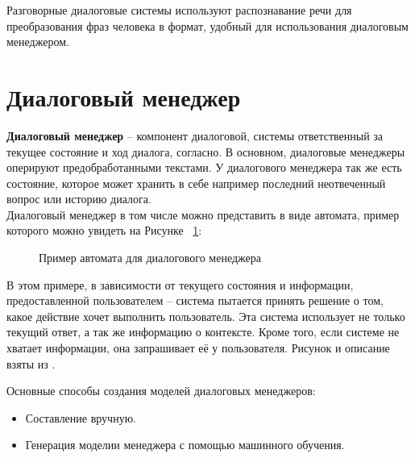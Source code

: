 \documentclass[times,specification,annotation]{itmo-student-thesis}
\begin{document}
	Разговорные диалоговые системы используют распознавание речи для преобразования фраз человека в формат, удобный для использования диалоговым менеджером.
	
	\section{Диалоговый менеджер}
	
	\textbf{Диалоговый менеджер} -- компонент диалоговой, системы ответственный за текущее состояние и ход диалога, согласно\cite{wiki:dialog-system}. В основном, диалоговые менеджеры оперируют предобработанными текстами. У диалогового менеджера так же есть состояние, которое может хранить в себе например последний неотвеченный вопрос или историю диалога.\\%
	
	Диалоговый менеджер в том числе можно представить в виде автомата, пример которого можно увидеть на Рисунке ~\ref{fig:manager_sample}:
	
	\begin{figure}[H]
		\caption{Пример автомата для диалогового менеджера}
		\label{fig:manager_sample}
	\end{figure}

	В этом примере, в зависимости от текущего состояния и информации, предоставленной пользователем -- система пытается принять решение о том, какое действие хочет выполнить пользователь. Эта система использует не только текущий ответ, а так же информацию о контексте. Кроме того, если системе не хватает информации, она запрашивает её у пользователя. Рисунок и описание взяты из \cite{inproceedings}.
	
	Основные способы создания моделей диалоговых менеджеров:
	\begin{itemize}
		\item Составление вручную.
		\item Генерация моделии менеджера с помощью машинного обучения.
	\end{itemize}
\end{document}
